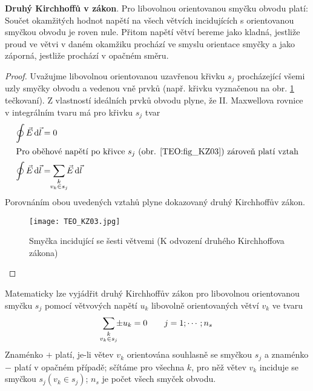       \textbf{Druhý Kirchhoffů v zákon}. Pro libovolnou orientovanou smyčku obvodu platí: Součet 
      okamžitých hodnot napětí na všech větvích incidujících s orientovanou smyčkou obvodu je roven 
      nule. Přitom napětí větví bereme jako kladná, jestliže proud ve větvi v daném okamžiku 
      prochází ve smyslu orientace smyčky a jako záporná, jestliže prochází v opačném směru.
      
      \begin{proof}
        Uvažujme libovolnou orientovanou uzavřenou křivku \(s_j\) procházející všemi uzly smyčky 
        obvodu a vedenou vně prvků (např. křivku vyznačenou na obr. \ref{TEO:fig_KZ03} tečkovaní). 
        Z vlastností ideálních prvků obvodu plyne, že II. Maxwellova rovnice v integrálním tvaru má 
        pro křivku \(s_j\) tvar
        \begin{align}
          \oint\vec{E}\dd{\vec{l}} &= 0    \label{TEO:eq_KZ01} \\
          \shortintertext{Pro oběhové napětí po křivce \(s_j\) (obr. \ref{TEO:fig_KZ03}) zároveň 
                          platí vztah}
          \oint\vec{E}\dd{\vec{l}} &= \sum_{\mathclap{\substack{k\\v_k\in s_j}}}\vec{E}\dd{\vec{l}}
        \end{align}
        Porovnáním obou uvedených vztahů plyne dokazovaný druhý Kirchhoffův zákon.
        \begin{figure}[ht!]
          \centering
          \texttt{[image: TEO\_KZ03.jpg]}
          \caption{Smyčka incidující se šesti větvemi (K odvození druhého Kirchhoffova 
                   zákona)\cite[s.~48]{Meyer1978}}
          \label{TEO:fig_KZ03}
        \end{figure}
      \end{proof}
      Matematicky lze vyjádřit druhý Kirchhoffův zákon pro libovolnou orientovanou smyčku \(s_j\) 
      pomocí větvových napětí \(u_k\) libovolně orientovaných větví \(v_k\) ve tvaru
      \begin{equation}\label{TEO:eq_KZ03}
        \sum_{\mathclap{\substack{k\\v_k\in s_j}}} \pm u_k = 0 \qquad j=1;\cdots; n_s
      \end{equation}
      Znaménko \(+\) platí, je-li větev \(v_k\) orientována souhlasně se smyčkou \(s_j\) a znaménko 
      \(-\) platí v opačném případě; sčítáme pro všechna \(k\), pro něž větev \(v_k\) inciduje se 
      smyčkou \(s_j (v_k\in s_j)\); \(n_s\) je počet všech smyček obvodu.
      
